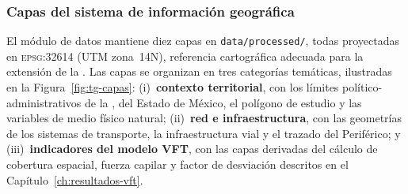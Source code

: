 \subsubsection{Capas del sistema de información geográfica}
\label{subsubsec:tg-capas}

El módulo de datos mantiene diez capas  en \texttt{data/processed/}, 
todas proyectadas en \textsc{epsg}:32614 (UTM zona~14N), referencia cartográfica adecuada 
para la extensión de la \zmvm{}. Las capas se organizan en tres categorías temáticas, ilustradas en la 
Figura~\ref{fig:tg-capas}: (i)~\textbf{contexto territorial}, con los límites político-administrativos de la \cdmx{}, del 
Estado de México, el polígono de estudio y las variables de medio físico natural; (ii)~\textbf{red e infraestructura}, 
con las geometrías de los sistemas de transporte, la infraestructura vial y el trazado del Periférico; y 
(iii)~\textbf{indicadores del modelo VFT}, con las capas derivadas del cálculo de cobertura espacial, 
fuerza capilar y factor de desviación descritos en el Capítulo~\ref{ch:resultados-vft}.

